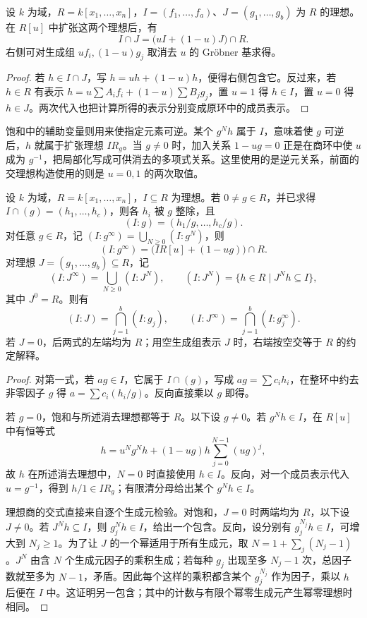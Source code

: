 \begin{proposition}\label{b3:prop:ideal-intersection-elimination}
	设 \(k\) 为域，\(R=k[x_1,\ldots,x_n]\)，\(I=(f_1,\ldots,f_a)\)、\(J=(g_1,\ldots,g_b)\) 为 \(R\) 的理想。在 \(R[u]\) 中扩张这两个理想后，有
	\[
		I\cap J=\bigl(uI+(1-u)J\bigr)\cap R.
	\]
	右侧可对生成组 \(uf_i,(1-u)g_j\) 取消去 \(u\) 的 Gröbner 基求得。
\end{proposition}
\begin{proof}
	若 \(h\in I\cap J\)，写 \(h=uh+(1-u)h\)，便得右侧包含它。反过来，若 \(h\in R\) 有表示 \(h=u\sum A_if_i+(1-u)\sum B_jg_j\)，置 \(u=1\) 得 \(h\in I\)，置 \(u=0\) 得 \(h\in J\)。两次代入也把计算所得的表示分别变成原环中的成员表示。
\end{proof}

饱和中的辅助变量则用来使指定元素可逆。某个 \(g^Nh\) 属于 \(I\)，意味着使 \(g\) 可逆后，\(h\) 就属于扩张理想 \(IR_g\)。当 \(g\ne0\) 时，加入关系 \(1-ug=0\) 正是在商环中使 \(u\) 成为 \(g^{-1}\)，把局部化写成可供消去的多项式关系。这里使用的是逆元关系，前面的交理想构造使用的则是 \(u=0,1\) 的两次取值。

\begin{proposition}\label{b3:prop:colon-saturation-elimination}
	设 \(k\) 为域，\(R=k[x_1,\ldots,x_n]\)，\(I\subseteq R\) 为理想。若 \(0\ne g\in R\)，并已求得 \(I\cap(g)=(h_1,\ldots,h_c)\)，则各 \(h_i\) 被 \(g\) 整除，且
	\[
		(I:g)=(h_1/g,\ldots,h_c/g).
	\]
	对任意 \(g\in R\)，记 \((I:g^\infty)=\bigcup_{N\ge0}(I:g^N)\)，则
	\[
		(I:g^\infty)=\bigl(IR[u]+(1-ug)\bigr)\cap R.
	\]
	对理想 \(J=(g_1,\ldots,g_b)\subseteq R\)，记
	\[
		(I:J^\infty)=\bigcup_{N\ge0}(I:J^N),\qquad (I:J^N)=\{h\in R\mid J^Nh\subseteq I\},
	\]
	其中 \(J^0=R\)。则有
	\[
		(I:J)=\bigcap_{j=1}^b(I:g_j),\qquad (I:J^\infty)=\bigcap_{j=1}^b(I:g_j^\infty).
	\]
	若 \(J=0\)，后两式的左端均为 \(R\)；用空生成组表示 \(J\) 时，右端按空交等于 \(R\) 的约定解释。
\end{proposition}
\begin{proof}
	对第一式，若 \(ag\in I\)，它属于 \(I\cap(g)\)，写成 \(ag=\sum c_i h_i\)，在整环中约去非零因子 \(g\) 得 \(a=\sum c_i(h_i/g)\)。反向直接乘以 \(g\) 即得。

	若 \(g=0\)，饱和与所述消去理想都等于 \(R\)。以下设 \(g\ne0\)。若 \(g^Nh\in I\)，在 \(R[u]\) 中有恒等式
	\[
		h=u^Ng^Nh+(1-ug)h\sum_{j=0}^{N-1}(ug)^j,
	\]
	故 \(h\) 在所述消去理想中，\(N=0\) 时直接使用 \(h\in I\)。反向，对一个成员表示代入 \(u=g^{-1}\)，得到 \(h/1\in IR_g\)；有限清分母给出某个 \(g^Nh\in I\)。

	理想商的交式直接来自逐个生成元检验。对饱和，\(J=0\) 时两端均为 \(R\)，以下设 \(J\ne0\)。若 \(J^Nh\subseteq I\)，则 \(g_j^Nh\in I\)，给出一个包含。反向，设分别有 \(g_j^{N_j}h\in I\)，可增大到 \(N_j\ge1\)。为了让 \(J\) 的一个幂适用于所有生成元，取 \(N=1+\sum_j(N_j-1)\)。\(J^N\) 由含 \(N\) 个生成元因子的乘积生成；若每种 \(g_j\) 出现至多 \(N_j-1\) 次，总因子数就至多为 \(N-1\)，矛盾。因此每个这样的乘积都含某个 \(g_j^{N_j}\) 作为因子，乘以 \(h\) 后便在 \(I\) 中。这证明另一包含；其中的计数与有限个幂零生成元产生幂零理想时相同。
\end{proof}

